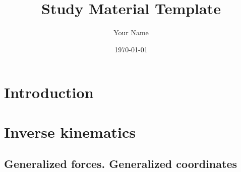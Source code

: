 \documentclass{article}
\title{Study Material Template}
\author{Your Name}
\date{\today}
\begin{document}
\maketitle

\tableofcontents
\newpage


\section{Introduction}

\section{Inverse kinematics}



\subsection{Generalized forces. Generalized coordinates}
\end{document}
